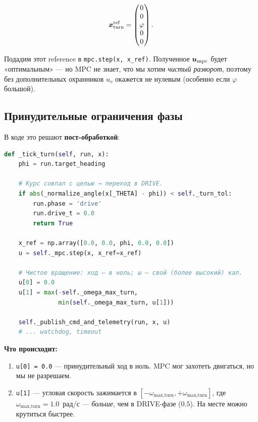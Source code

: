 \begin{formulabox}[title={Reference фазы TURN}]
\begin{equation}
  \bm{x}^\text{ref}_\text{turn} = \begin{pmatrix} 0\\ 0\\ \varphi\\ 0\\ 0 \end{pmatrix}.
  \label{eq:turn_ref}
\end{equation}
\end{formulabox}

Подадим этот reference в \texttt{mpc.step(x, x\_ref)}. Полученное
$\bm{u}_\text{mpc}$ будет «оптимальным» --- но MPC не знает, что мы
хотим \emph{чистый разворот}, поэтому без дополнительных охранников
$u_v$ окажется не нулевым (особенно если $\varphi$ большой).

\subsection{Принудительные ограничения фазы}

В коде это решают \textbf{пост-обработкой}:

\begin{codebox}[title={\filepath{pi\_nodes/nodes/mps\_node.py:384}, фаза TURN}]
\begin{lstlisting}[language=Python]
def _tick_turn(self, run, x):
    phi = run.target_heading

    # Курс совпал с целью → переход в DRIVE.
    if abs(_normalize_angle(x[_THETA] - phi)) < self._turn_tol:
        run.phase = 'drive'
        run.drive_t = 0.0
        return True

    x_ref = np.array([0.0, 0.0, phi, 0.0, 0.0])
    u = self._mpc.step(x, x_ref=x_ref)

    # Чистое вращение: ход — в ноль; ω — свой (более высокий) кап.
    u[0] = 0.0
    u[1] = max(-self._omega_max_turn,
               min(self._omega_max_turn, u[1]))

    self._publish_cmd_and_telemetry(run, x, u)
    # ... watchdog, timeout
\end{lstlisting}
\end{codebox}

\textbf{Что происходит:}
\begin{enumerate}
  \item \texttt{u[0] = 0.0} --- принудительный ход в ноль. MPC мог
        захотеть двигаться, но мы не разрешаем.
  \item \texttt{u[1]} --- угловая скорость зажимается в
        $[-\omega_\text{max,turn}, +\omega_\text{max,turn}]$, где
        $\omega_\text{max,turn} = 1.0$~рад/с --- \emph{больше}, чем в
        DRIVE-фазе ($0.5$). На месте можно крутиться быстрее.
\end{enumerate}

